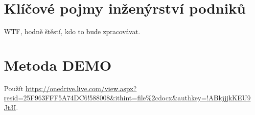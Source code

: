 \documentclass{szzclass}
\begin{document}
\section{Klíčové pojmy inženýrství podniků}
WTF, hodně štěstí, kdo to bude zpracovávat.

\section{Metoda DEMO}
Použít \url{https://onedrive.live.com/view.aspx?resid=25F963FFF5A74DC6!588008&ithint=file%2cdocx&authkey=!ABkjjjkKEU9Jt3I}.
\end{document}
